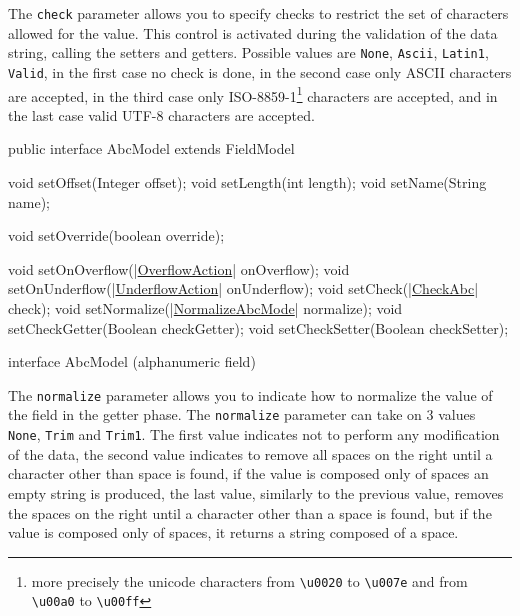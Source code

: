 The \hypertarget{abc:chk}{\texttt{check}} parameter allows you to specify checks 
to restrict the set of characters allowed for the value. This control is 
activated during the validation of the data string, calling the setters and 
getters. 
Possible values are \verb!None!, \verb!Ascii!, \verb!Latin1!, \verb!Valid!, in 
the first case no check is done, in the second case only ASCII characters are 
accepted, in the third case only ISO-8859-1\footnote{%
more precisely the unicode characters from \texttt{\textbackslash u0020} to 
\texttt{\textbackslash u007e} and from \texttt{\textbackslash u00a0} to 
\texttt{\textbackslash u00ff}
} characters are accepted, and in the last case valid UTF-8 characters are 
accepted.

\begin{elisting}[!htb]
\begin{javacode}
public interface AbcModel extends FieldModel {
    void setOffset(Integer offset);
    void setLength(int length);
    void setName(String name);

    void setOverride(boolean override);

    void setOnOverflow(|\hyperref[lst:OverflowAction]{OverflowAction}| onOverflow);
    void setOnUnderflow(|\hyperref[lst:UnderflowAction]{UnderflowAction}| onUnderflow);
    void setCheck(|\hyperref[lst:CheckAbc]{CheckAbc}| check);
    void setNormalize(|\hyperref[lst:NormalizeAbcMode]{NormalizeAbcMode}| normalize);
    void setCheckGetter(Boolean checkGetter);
    void setCheckSetter(Boolean checkSetter);
}
\end{javacode}
\caption{interface AbcModel (alphanumeric field)}
\label{lst:AbcModel}
\end{elisting}

The \hypertarget{abc:nrm}{\texttt{normalize}} parameter allows you to indicate 
how to normalize the value of the field in the getter phase. 
The \verb!normalize! parameter can take on 3 values \verb!None!, \verb!Trim! 
and \verb!Trim1!. The first value indicates not to perform any modification of 
the data, the second value indicates to remove all spaces on the right until a 
character other than space is found, if the value is composed only of spaces an 
empty string is produced, the last value, similarly to the previous value, 
removes the spaces on the right until a character other than a space is found, 
but if the value is composed only of spaces, it returns a string composed of a 
space.

